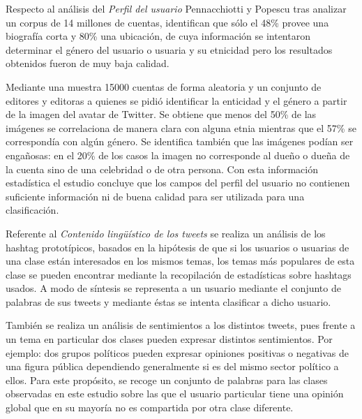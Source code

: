 	        Respecto al análisis del \emph{Perfil del usuario} Pennacchiotti y Popescu tras analizar un corpus de
	        14 millones de cuentas, identifican que sólo el 48\% provee una biografía corta y 80\% una ubicación, de cuya información se intentaron determinar el género del usuario o usuaria y su etnicidad pero los resultados obtenidos fueron de muy baja calidad. 
	        
	        Mediante una muestra 15000 cuentas de forma aleatoria y un conjunto de editores y editoras a quienes se pidió identificar la enticidad y el género a partir de la imagen del avatar de Twitter. Se obtiene que menos del 50\% de las imágenes se correlaciona de manera clara con alguna etnia mientras que el 57\% se correspondía con algún género. Se identifica también que las imágenes podían ser engañosas: en el 20\% de los casos la imagen no corresponde al dueño o dueña de la cuenta sino de una celebridad o de otra persona. Con esta información estadística el estudio concluye que los campos del perfil del usuario no contienen suficiente información ni de buena calidad para ser utilizada para una clasificación.
	        
	        
	        
	        
	        Referente al \emph{Contenido lingüístico de los tweets} se realiza un análisis de los hashtag prototípicos, basados en la hipótesis de que si los usuarios o usuarias de una clase están interesados en los mismos temas, los temas más populares de esta clase se pueden encontrar mediante la recopilación de estadísticas sobre hashtags usados. A modo de síntesis se representa a un usuario mediante el conjunto de palabras de sus tweets y mediante éstas se intenta clasificar a dicho usuario.
	               
	         También se realiza un análisis de sentimientos a los distintos tweets, pues frente a un tema en particular dos clases pueden expresar distintos sentimientos. Por ejemplo: dos grupos políticos pueden expresar opiniones positivas o negativas de una figura pública dependiendo generalmente si es del mismo sector político a ellos.  Para este propósito, se recoge un conjunto de palabras para las clases observadas en este estudio sobre las que el usuario particular tiene una opinión global que en su mayoría no es compartida por otra clase diferente.

